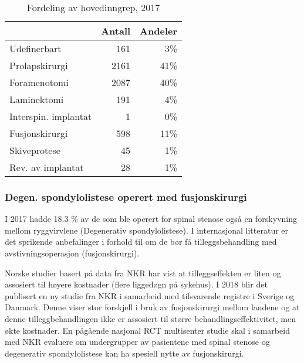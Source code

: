 \begin{table}[ht]
\centering
\begin{tabular}{lrr}
  \hline
 & Antall & Andeler \\ 
  \hline
Udefinerbart & 161 & 3\% \\ 
  Prolapskirurgi & 2161 & 41\% \\ 
  Foramenotomi & 2087 & 40\% \\ 
  Laminektomi & 191 & 4\% \\ 
  Interspin. implantat & 1 & 0\% \\ 
  Fusjonskirurgi & 598 & 11\% \\ 
  Skiveprotese & 45 & 1\% \\ 
  Rev. av implantat & 28 & 1\% \\ 
   \hline
\end{tabular}
\caption{Fordeling av hovedinngrep, 2017} 
\label{tab:AntHovedInngrep}
\end{table}






\subsubsection{Degen. spondylolistese operert med fusjonskirurgi}


I 2017 hadde 18.3 \% av de som ble operert for spinal stenose  også en forskyvning mellom ryggvirvlene (Degenerativ spondylolistese). I internasjonal litteratur er det sprikende anbefalinger i forhold til om de bør få tilleggsbehandling med avstivningsoperasjon (fusjonskirurgi).
 

Norske studier basert på data fra NKR har vist at tilleggseffekten er liten og assosiert til høyere kostnader (flere liggedøgn på sykehus). 
I 2018 blir det publisert en ny studie fra NKR i samarbeid med  tilsvarende registre i Sverige og Danmark. Denne viser stor forskjell i bruk av fusjonskirurgi mellom landene og at denne tilleggbehandlingen ikke er assosiert til større behandlingseffektivitet, men økte kostnader. En pågående nasjonal RCT multisenter studie skal i samarbeid med NKR evaluere om undergrupper av pasientene med spinal stenose og degenerativ spondylolistese kan ha spesiell nytte av fusjonskirurgi.
\clearpage

